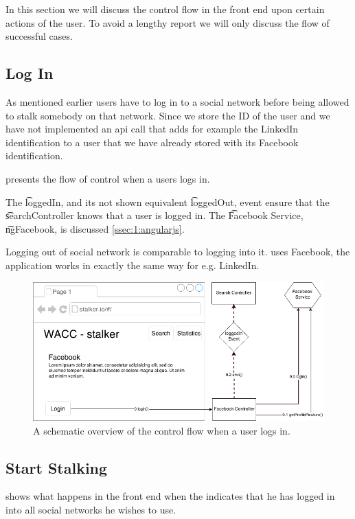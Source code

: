 In this section we will discuss the control flow in the front end upon certain actions of the user. To avoid a lengthy report we will only discuss the flow of successful cases.

\subsection{Log In}
\label{ss:1:login}
	As mentioned earlier users have to log in to a social network before being allowed to stalk somebody on that network. Since we store the ID of the user and we have not implemented an api call that adds for example the LinkedIn identification to a user that we have already stored with its Facebook identification.

	 presents the flow of control when a users logs in.

	The \t{loggedIn}, and its not shown equivalent \t{loggedOut}, event ensure that the \t{searchController} knows that a user is logged in. The \t{Facebook Service}, \t{ngFacebook}, is discussed \vref{ssec:1:angularjs}. 

	Logging out of social network is comparable to logging into it.  uses Facebook, the application works in exactly the same way for e.g. LinkedIn.

	\begin{figure}
		\includegraphics[width=\textwidth]{./img/1_login_flow}
		\caption{A schematic overview of the control flow when a user logs in.}
		\label{fig:1:controlflowLogIn}
	\end{figure}	

\subsection{Start Stalking}
\label{ss:1:startStalking}
	 shows what happens in the front end when the indicates that he has logged in into all social networks he wishes to use. 
	
